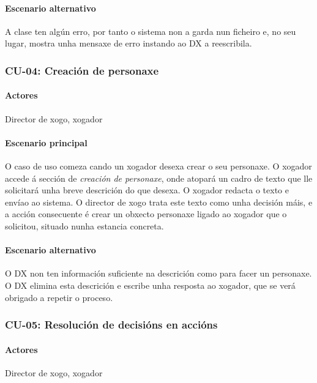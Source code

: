 \paragraph{Escenario alternativo}
A clase ten algún erro, por tanto o sistema non a garda nun ficheiro e, no seu
lugar, mostra unha mensaxe de erro instando ao DX a reescribila.

\subsubsection{CU-04: Creación de personaxe}
\paragraph{Actores}
Director de xogo, xogador
\paragraph{Escenario principal}
O caso de uso comeza cando un xogador desexa crear o seu personaxe. O xogador
accede á sección de {\it creación de personaxe}, onde atopará un cadro de texto
que lle solicitará unha breve descrición do que desexa. O xogador redacta o
texto e envíao ao sistema.
O director de xogo trata este texto como unha decisión máis, e a acción
consecuente é crear un obxecto personaxe ligado ao xogador que o solicitou,
situado nunha estancia concreta.

\paragraph{Escenario alternativo}
O DX non ten información suficiente na descrición como para facer un personaxe.
O DX elimina esta descrición e escribe unha resposta ao xogador, que se verá
obrigado a repetir o proceso.

\subsubsection{CU-05: Resolución de decisións en accións}
\paragraph{Actores}
Director de xogo, xogador
